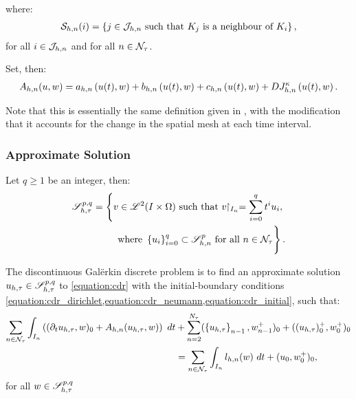 \newpage
where:
\begin{align}
    \mathcal{S}_{h, n}(i) = \left\{ j \in \mathcal{J}_{h, n} \text{ such that } K_j \text{ is a neighbour of } K_i \right\},
\end{align}
for all $i \in \mathcal{J}_{h, n}$ and for all $n \in \mathcal{N}_{\tau}$.

Set, then:
\begin{align}
    A_{h, n}(u, w) = a_{h, n} \left( u(t), w \right) + b_{h, n} \left( u(t), w \right) + c_{h, n} \left( u(t), w \right) + D J^{\kappa}_{h, n} \left( u(t), w \right) \label{equation:cdr_Ahn}.
\end{align}

Note that this is essentially the same definition given in , with the modification that it accounts for the change in the spatial mesh at each time interval.

\newpage
\subsubsection{Approximate Solution}

\begin{definition}[$\SpaceSolutionFull$]
    Let $q \geq 1$ be an integer, then:
    \begin{align} %
        \SpaceSolutionFull = \left\{ v \in \SpaceLp{2}(I \times \Omega) \text{ such that } v \Restriction_{I_n} = \sum_{i = 0}^q t^i u_i, \right. \\ 
        \left. \vphantom{\sum_{i = 0}^q} \text{ where } \left\{ u_i \right\}_{i = 0}^q \subset \SpaceSolution_{h, n}^p \text{ for all } n \in \TimeIndices \right\}.
    \end{align}
\end{definition}

The discontinuous Galërkin discrete problem is to find an approximate solution $u_{h, \tau} \in \mathscr{S}^{p, q}_{h, \tau}$ to \cref{equation:cdr} with the initial-boundary conditions \cref{equation:cdr_dirichlet,equation:cdr_neumann,equation:cdr_initial}, such that:
\begin{align} %
    \sum_{n \in \TimeIndices} \int_{I_n} \left( (\partial_t u_{h, \tau}, w )_0 + A_{h, n}(u_{h, \tau}, w) \right) ~ dt \notag &+ \sum_{n = 2}^{\nTimeIndices} (\left\{ u_{h, \tau} \right\}_{n - 1}, w_{n - 1}^+ )_0 + ((u_{h, \tau})_0^+, w_0^+ )_0 \notag \\
    &= \sum_{n \in \TimeIndices} \int_{I_n} l_{h, n}(w) ~ dt + (u_0, w_0^+ )_0, \label{equation:cdr_discrete}
\end{align}
for all $w \in \mathscr{S}^{p, q}_{h, \tau}$

